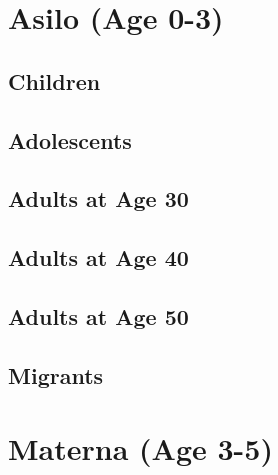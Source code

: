 \documentclass[12pt]{article}
\begin{document}
\clearpage
\singlespacing
\listoftables

\section{Asilo (Age 0-3)}
\subsection{Children}




\subsection{Adolescents}




\subsection{Adults at Age 30}




\subsection{Adults at Age 40}




\subsection{Adults at Age 50}




\subsection{Migrants}






\section{Materna (Age 3-5)}
\end{document}
